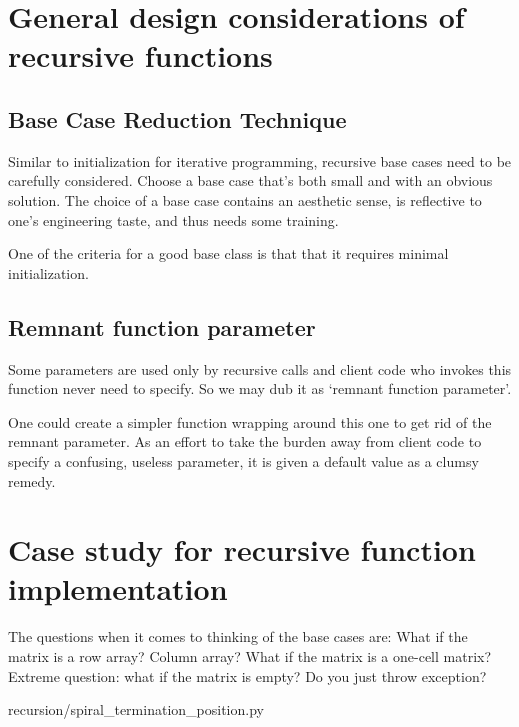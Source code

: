 \section{General design considerations of recursive functions}\label{sec:generalRecursiveFunction}

\subsection{Base Case Reduction Technique}\label{subsec:baseCaseShrinkingTechnique}

Similar to initialization for iterative programming, recursive base cases need to be carefully
considered.
Choose a base case that's both small and with an obvious solution.
The choice of a base case contains an aesthetic sense, is reflective to one's
engineering taste, and thus needs some training.

One of the criteria for a good base class is that that it requires minimal initialization.

\subsection{Remnant function parameter}\label{sec:remnantFunctionParameter}

Some parameters are used only by recursive calls and
client code who invokes this function never need to specify.
So we may dub it as `remnant function parameter'.

One could create a simpler function wrapping around this one to get rid of the remnant
parameter.
As an effort to take the burden away from client code to specify a confusing, useless parameter,
it is given a default value as a clumsy remedy.

\section{Case study for recursive function implementation}\label{sec:recursivecaseStudy}

The questions when it comes to thinking of the base cases are:
What if the matrix is a row array?
Column array?
What if the matrix is a one-cell matrix?
Extreme question: what if the matrix is empty?
Do you just throw exception?

\begin{clisting}
    
    {recursion/spiral_termination_position.py}
\end{clisting}

